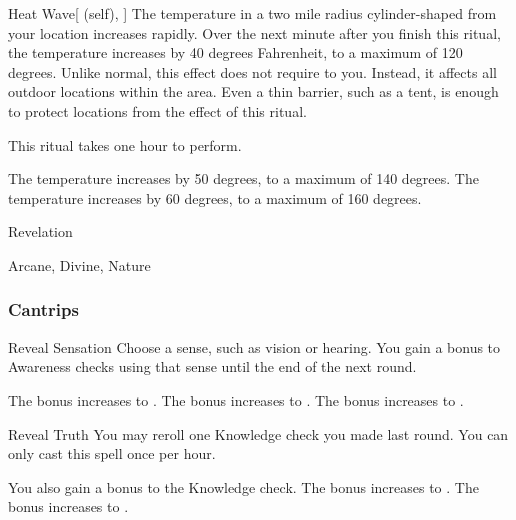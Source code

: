 \lowercase{\hypertarget{spell:Heat Wave}{}}\label{spell:Heat Wave}
\begin{attuneability}[Rank 4]{\hypertarget{spell:Heat Wave}{Heat Wave}}[ (self), ]
\targetrule
The temperature in a two mile radius cylinder-shaped  from your location increases rapidly.
Over the next minute after you finish this ritual, the temperature increases by 40 degrees Fahrenheit, to a maximum of 120 degrees.
Unlike normal, this effect does not require  to you.
Instead, it affects all outdoor locations within the area.
Even a thin barrier, such as a tent, is enough to protect locations from the effect of this ritual.

This ritual takes one hour to perform.

\rankline
{} The temperature increases by 50 degrees, to a maximum of 140 degrees.
 The temperature increases by 60 degrees, to a maximum of 160 degrees.
\end{attuneability}
\vspace{0.25em}


\newpage
\begin{spellsection}{Revelation}

\begin{spellheader}
\end{spellheader}


 Arcane, Divine, Nature

\subsubsection{Cantrips}


\begin{freeability}{Reveal Sensation}
Choose a sense, such as vision or hearing.
You gain a  bonus to Awareness checks using that sense until the end of the next round.

\rankline
{} The bonus increases to .
 The bonus increases to .
 The bonus increases to .
\end{freeability}


\begin{freeability}{Reveal Truth}
You may reroll one Knowledge check you made last round.
You can only cast this spell once per hour.

\rankline
{} You also gain a  bonus to the Knowledge check.
 The bonus increases to .
 The bonus increases to .
\end{freeability}

\end{spellsection}


